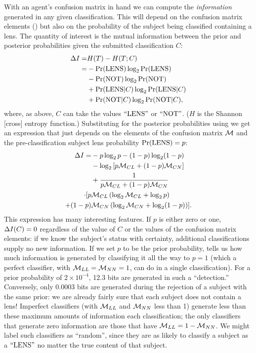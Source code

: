 \documentclass[useAMS,usenatbib,a4paper]{mn2e}
\begin{document}
With an agent's confusion matrix in hand we can compute the
\emph{information} generated in any given classification. This will
depend on the confusion matrix elements () but also on
the probability of the subject being classified containing a lens. The
quantity of interest is the mutual information between the prior and
posterior probabilities given the submitted classification $C$:
\begin{align}
\Delta I =& H(T) - H(T;C) \notag \\ 
             =& -{\rm Pr}({\rm LENS}) \log_2 {\rm Pr}({\rm LENS}) \notag \\
              & -{\rm Pr}({\rm NOT}) \log_2 {\rm Pr}({\rm NOT}) \notag \\
              & +{\rm Pr}({\rm LENS}|C) \log_2 {\rm Pr}({\rm LENS}|C) \notag \\
              & +{\rm Pr}({\rm NOT}|C) \log_2 {\rm Pr}({\rm NOT}|C),
\end{align}
where, as above, $C$ can take the values ${\rm ``LENS"}$ or ${\rm ``NOT"}$. 
($H$ is the Shannon [cross] entropy function.) 
Substituting for the posterior probabilities using  we get
an expression that just depends on the elements of the 
confusion matrix $\mathcal{M}$ and the pre-classification subject lens
probability ${\rm Pr}({\rm LENS}) = p$:
\begin{align}
\Delta I =    & -    p \log_2 p - (1-p) \log_2 (1-p) \notag \\
                  & - \log_2 \left[ p \mathcal{M}_{CL} + (1-p) \mathcal{M}_{CN} \right] \notag \\
                  & + \frac{1}{p \mathcal{M}_{CL} + (1-p) \mathcal{M}_{CN}} \notag \\ 
     \cdot [  p   & \mathcal{M}_{CL} \left(\log_2 \mathcal{M}_{CL} + \log_2 p\right) \notag \\
         + (1-p)  & \mathcal{M}_{CN} \left(\log_2 \mathcal{M}_{CN} + \log_2 (1-p)\right) ].
  \label{eq:app:infogain}
\end{align}
This expression has many interesting features.  If $p$ is either zero or
one, $\Delta I(C) = 0$  regardless of the value of $C$ or the values
of the confusion matrix elements: if we know the subject's status with
certainty, additional classifications supply no new information. If we
set $p$ to be the prior probability,  tells us how
much information is generated by classifying it all the way to $p = 1$
(which a perfect classifier, with $\mathcal{M}_{LL} = \mathcal{M}_{NN} = 1$, can do in
a single classification). For a prior probability of $2\times 10^{-4}$, 
12.3 bits are generated in such a ``detection.'' 
Conversely, only 0.0003 bits
are generated during the rejection of a subject with the same prior: we
are already fairly sure that each subject does not contain a lens!
Imperfect classifiers (with $\mathcal{M}_{LL}$ and $\mathcal{M}_{NN}$ less than 1)
generate less than these maximum amounts of information each
classification; the only classifiers that generate zero information are
those that have $\mathcal{M}_{LL} = 1 - \mathcal{M}_{NN}$. We might label such
classifiers as ``random'', since they are as likely to classify a
subject as a ${\rm ``LENS"}$ no matter the true content of that subject. 
\end{document}
